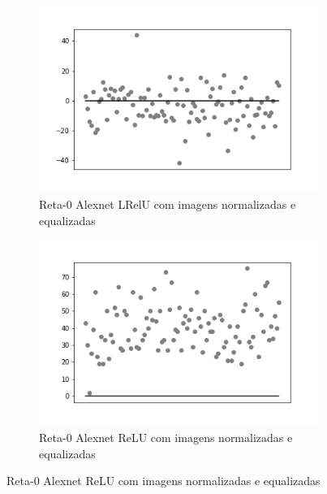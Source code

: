 \begin{figure}[hb!]
	\caption{Redes neurais biológicas.}
	\begin{subfigure}[hb]{0.5\linewidth}
		\caption{Reta-0 Alexnet LRelU com imagens normalizadas e equalizadas}
		\label{fig:histalexlrelunorm}
		\includegraphics[width=\linewidth]{img/graficos-fase2/fig-reta-0-alexnet-lrelu-data-augmentation-2-2.png}
	\end{subfigure}%
	\begin{subfigure}[hb]{0.5\linewidth}
		\caption{Reta-0 Alexnet ReLU com imagens normalizadas e equalizadas}
		\label{fig:redeneuralbiologica}
		\includegraphics[width=\linewidth]{img/graficos-fase2/fig-reta-0-alexnet-relu-data-augmentation-2-1.png}
	\end{subfigure}
\end{figure}

